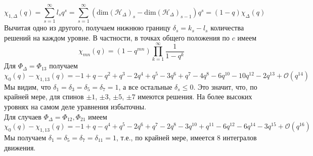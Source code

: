 \documentclass[12pt]{article}
\theoremstyle{definition}
\begin{document}
\begin{equation}
    \chi_{1,\Delta}(q)=\sum\limits_{s=1}^\infty l_sq^s=\sum\limits_{s=1}^\infty(\text{dim}(\mathcal{H}_\Delta)_s-\text{dim}(\mathcal{H}_\Delta)_{s-1})q^s=(1-q)\chi_\Delta(q)
\end{equation}
Вычитая одно из другого, получаем нижнюю границу $\delta_s = k_s-l_s$ количества решений на каждом уровне. В частности, в точках общего положения по $c$ имеем
\begin{equation}
    \chi_{mn}(q)=(1-q^{mn})\prod\limits_{k=1}^\infty\frac{1}{1-q^k}
\end{equation}
Для $\Phi_\Delta =\Phi_{13}$ получаем
\begin{equation}
    \chi_0(q)-\chi_{1,13}(q)=-1+q-q^2+q^3-2q^4+q^5-3q^6+q^7-4q^8-6q^{10}-10q^{12}-2q^{13}+\mathcal{O}(q^{14})
\end{equation}
Мы видим, что $\delta_1 = \delta_3 = \delta_5 = \delta_7 = 1$, а все остальные $\delta_s \leq 0$. Это значит, что, по крайней мере, для спинов $\pm1$, $\pm3$, $\pm5$, $\pm7$ имеются решения. На более высоких уровнях на самом деле уравнения избыточны.\\
Для случаев $\Phi_\Delta = \Phi_{12}, \Phi_{21}$ имеем
\begin{equation}
    \chi_0(q)-\chi_{1,13}(q)=-1+q-q^4+q^5-2q^6+q^7-2q^8-3q^{10}+q^{11}-6q^{12}-6q^{14}-3q^{15}+\mathcal{O}(q^{16})
\end{equation}
Мы получаем $\delta_1=\delta_5=\delta_7=\delta_{11}=1$, т.е., по крайней мере, имеется 8 интегралов движения.
\end{document}
